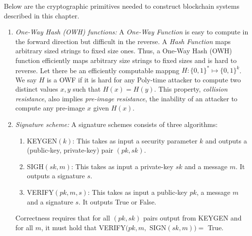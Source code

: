 \documentclass[]{report}   %
\begin{document}
Below are the cryptographic primitives needed to construct blockchain systems described in this chapter.
\begin{enumerate}
	\item {\em One-Way Hash (OWH) functions:} A {\em One-Way Function} is easy to compute in the forward direction but difficult in the reverse. A {\em Hash Function} maps arbitrary sized strings to fixed size ones. Thus, a One-Way Hash (OWH) function efficiently maps arbitrary size strings to fixed sizes and is hard to reverse. Let there be an efficiently computable mappng $H:\{0,1\}^*\mapsto \{0,1\}^k$. 
	We say $H$ is a OWF if it is hard for any Poly-time attacker to compute two distinct values $x, y$ such that $H(x)=H(y)$. This property, {\em collision resistance}, also implies {\em pre-image resistance}, the inability of an attacker to compute any pre-image $x$ given $H(x)$.
	
	\item {\em Signature scheme:} A signature schemes consists of three algorithms:
	
	\begin{enumerate}
		\item  KEYGEN$(k)$: This takes as input a security parameter $k$ and outputs a (public-key, private-key) pair $(pk, sk)$. 
		\item  SIGH$(sk, m)$: This takes as input a private-key $sk$ and a message $m$. It outputs a signature $s$.
		\item  VERIFY$(pk, m, s)$: This takes as input a public-key $pk$, a message $m$ and a signature $s$. It outputs True or False.
	\end{enumerate}
	Correctness requires that for all $(pk, sk)$ pairs output from KEYGEN and for all $m$, it must hold that VERIFY$(pk, m, $ SIGN$(sk, m)) = $ True.
	
	

\end{enumerate}
\end{document}
